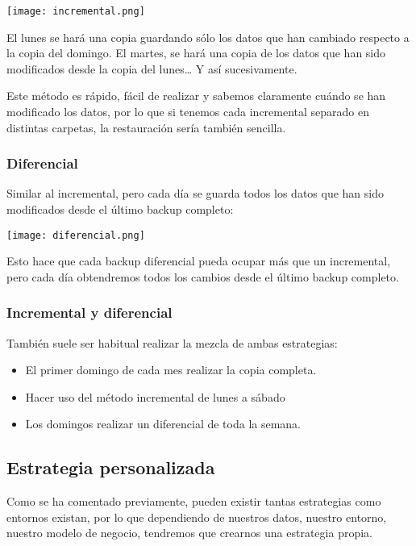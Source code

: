 \begin{center}
    \texttt{[image: incremental.png]}
\end{center}

El lunes se hará una copia guardando sólo los datos que han cambiado respecto a la copia del domingo. El martes, se hará una copia de los datos que han sido modificados desde la copia del lunes… Y así sucesivamente.

Este método es rápido, fácil de realizar y sabemos claramente cuándo se han modificado los datos, por lo que si tenemos cada incremental separado en distintas carpetas, la restauración sería también sencilla.

\subsubsection{Diferencial}
Similar al incremental, pero cada día se guarda todos los datos que han sido modificados desde el último backup completo:

\begin{center}
    \texttt{[image: diferencial.png]}
\end{center}

Esto hace que cada backup diferencial pueda ocupar más que un incremental, pero cada día obtendremos todos los cambios desde el último backup completo.

\subsubsection{Incremental y diferencial}
También suele ser habitual realizar la mezcla de ambas estrategias:
\begin{itemize}
    \item El primer domingo de cada mes realizar la copia completa.
    \item Hacer uso del método incremental de lunes a sábado
    \item Los domingos realizar un diferencial de toda la semana.
\end{itemize}

\subsection{Estrategia personalizada}
Como se ha comentado previamente, pueden existir tantas estrategias como entornos existan, por lo que dependiendo de nuestros datos, nuestro entorno, nuestro modelo de negocio, tendremos que crearnos una estrategia propia.

